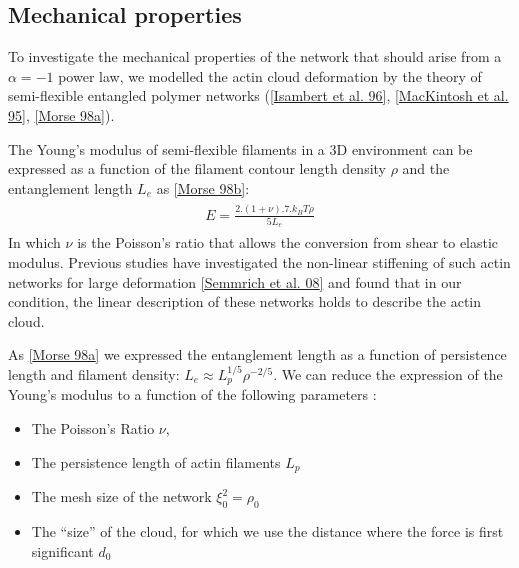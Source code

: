 \documentclass[A4paperpaper,11pt,english]{sphinxmanual}
\begin{document}
\subsection{Mechanical properties}
\label{parts/part3:mechanical-properties}
To investigate the mechanical properties of the network that should arise from
a \(\alpha = -1\) power law, we modelled the actin cloud deformation by
the theory of semi-flexible entangled polymer networks ({\hyperref[parts/part3:isambert1996]{{[}Isambert et al. 96{]}}},
{\hyperref[parts/part3:mackintosh1995]{{[}MacKintosh et al. 95{]}}}, {\hyperref[parts/part3:morse1998a]{{[}Morse 98a{]}}}).

The Young's modulus of semi-flexible filaments in a 3D environment can be
expressed as a function of the filament contour length density \(\rho\) and the
entanglement length \(L_e\) as {\hyperref[parts/part3:morse1998b]{{[}Morse 98b{]}}}:
\label{parts/part3:equation-eqa37}\begin{gather}
\begin{split}E= \frac{2.(1+\nu).7.k_BT \rho}{5L_e}\end{split}\label{parts/part3-eqa37}
\end{gather}
In which \(\nu\) is the Poisson’s ratio that allows the conversion from shear to
elastic modulus. Previous studies have investigated the non-linear stiffening of
such actin networks for large deformation {\hyperref[parts/part3:semmrich2008]{{[}Semmrich et al. 08{]}}} and found that in
our condition, the linear description of these networks holds to describe the
actin cloud.

As {\hyperref[parts/part3:morse1998a]{{[}Morse 98a{]}}} we expressed the entanglement length as a
function of persistence length and filament density: \(L_e\approx L_p^{1/5} \rho^{-2/5}\). We can
reduce the expression of the Young's modulus to a function of the following
parameters :
\begin{itemize}
\item {} 
The Poisson’s Ratio \(\nu\),

\item {} 
The persistence length of actin filaments \(L_p\)

\item {} 
The mesh size of the network \(\xi_0^2 = \rho_0\)

\item {} 
The ``size'' of the cloud, for which we use the distance where the force
is first significant \(d_0\)

\end{itemize}
\end{document}

